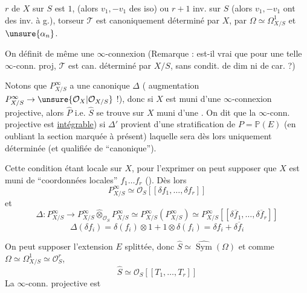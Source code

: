 $r$ de $X$ sur $S$ est $1$,  (alors $v_1,-v_1$ des iso) ou $r+1$ inv. sur $S$ (alors $v_1,-v_1$ ont des inv. à g.),  torseur $\mathcal{T}$ est canoniquement déterminé par $X$, par $\Omega\simeq\Omega^1_{X/S}$ et $\unsure{\alpha_n}$.

On définit de même une $\infty$-connexion  (Remarque : est-il vrai que pour une telle $\infty$-conn. proj, $\mathcal{T}$ est can. déterminé par $X/S$, sans condit. de dim ni de car. ?)

Notons que  $P^\infty_{X/S}$ a une    canonique $\Delta$ ( augmentation $P^\infty_{X/S}\to\unsure{\mathcal{O}_X|\mathcal{O}_{X/S}}$ !), donc si $X$ est muni d'une $\infty$-connexion projective, alors  $\widehat P$ i.e. $\widehat S$ se trouve sur $X$ muni d'une    . On dit que la $\infty$-conn. projective est  \uline{intégrable}) si $\Delta'$ provient d'une  stratification de $P=\mathbb{P}(E)$ (en oubliant  la section marquée à présent) laquelle sera dès lors uniquement déterminée (et qualifiée de ``canonique'').

Cette condition étant locale sur $X$, pour l'exprimer on peut supposer que $X$ est muni de ``coordonnées locales'' $f_1\ldots f_r$ (). Dès lors
\[
P^\infty_{X/S}\simeq\mathcal{O}_S[[\delta f_1,\ldots,\delta f_r]]
\]
et
\[
\Delta:P^\infty_{X/S}\longrightarrow P^\infty_{X/S}\widehat\otimes_{\mathcal{O}_S}P^\infty_{X/S}
\simeq P^\infty_{X/S}(P^\infty_{X/S})\simeq P^\infty_{X/S}[[\overline{\delta f_1},\ldots,\overline{\delta f_r}]]
\]
\[
\Delta(\delta f_i)=\delta(f_i)\otimes1+1\otimes\delta(f_i)=\delta f_i+\overline{\delta f_i}
\]

On peut supposer l'extension $E$ splittée, donc $\widehat S\simeq\widehat{\operatorname{Sym}}(\Omega)$ et comme $\Omega\simeq\Omega^1_{X/S}\simeq\mathcal{O}_S^r$,
\[
\widehat S\simeq\mathcal{O}_S[[T_1,\ldots,T_r]]
\]
La $\infty$-conn. projective est
